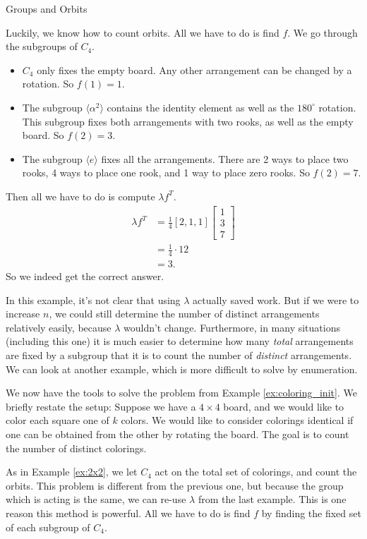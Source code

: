 \documentclass[12pt]{pom_thesis}
\begin{document}
\begin{chapter}{Groups and Orbits}
\begin{examp}
Luckily, we know how to count orbits. All we have to do is find $f$. We go through the subgroups of $C_4$.
\begin{itemize}
\item $C_4$ only fixes the empty board. Any other arrangement can be changed by a rotation. So $f(1) = 1$.
\item The subgroup $\langle \alpha^2 \rangle$ contains the identity element as well as the $180^\circ$ rotation. This subgroup fixes both arrangements with two rooks, as well as the empty board. So $f(2) = 3$.
\item The subgroup $\langle e \rangle$ fixes all the arrangements. There are 2 ways to place two rooks, 4 ways to place one rook, and 1 way to place zero rooks. So $f(2) = 7$.
\end{itemize}
Then all we have to do is compute $\lambda f^T$.
\begin{align*}
\lambda f^T &= \frac 14 [2, 1, 1] \begin{bmatrix} 1 \\ 3 \\ 7\end{bmatrix} \\
&= \frac 14\cdot 12\\
&=3.
\end{align*}
So we indeed get the correct answer. 
\end{examp}

In this example, it's not clear that using $\lambda$ actually saved work. But if we were to increase $n$, we could still determine the number of distinct arrangements relatively easily, because $\lambda$ wouldn't change. Furthermore, in many situations (including this one) it is much easier to determine how many \emph{total} arrangements are fixed by a subgroup that it is to count the number of \emph{distinct} arrangements. We can look at another example, which is more difficult to solve by enumeration. 
\begin{examp}\label{ex:coloring}
We now have the tools to solve the problem from Example \ref{ex:coloring_init}. We briefly restate the setup: Suppose we have a $4 \times 4$ board, and we would like to color each square one of $k$ colors. We would like to consider colorings identical if one can be obtained from the other by rotating the board. The goal is to count the number of distinct colorings.

As in Example \ref{ex:2x2}, we let $C_4$ act on the total set of colorings, and count the orbits. This problem is different from the previous one, but because the group which is acting is the same, we can re-use $\lambda$ from the last example. This is one reason this method is powerful. All we have to do is find $f$ by finding the fixed set of each subgroup of $C_4$.


\end{examp}
\end{chapter}
\end{document}
